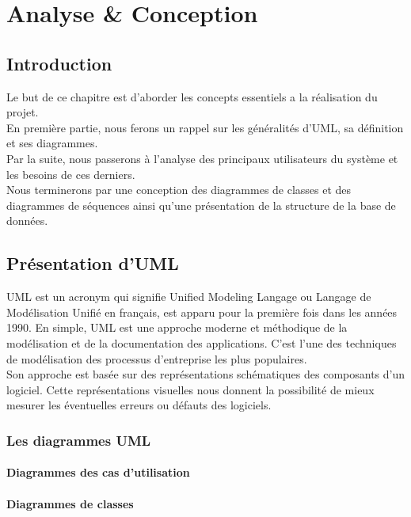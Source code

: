 \chapter{Analyse \& Conception}

\section{Introduction}
Le but de ce chapitre est d'aborder les concepts essentiels a la réalisation du projet.\\

En première partie, nous ferons un rappel sur les généralités d'UML, sa définition et ses diagrammes.\\

Par la suite, nous passerons à l'analyse des principaux utilisateurs du système et les besoins de ces derniers.\\

Nous terminerons par une conception des diagrammes de classes et des diagrammes de séquences ainsi qu'une présentation de la structure de la base de données.\\

\section{Présentation d'\acs{UML}}
\acs{UML} est un acronym qui signifie Unified Modeling Langage ou Langage de Modélisation Unifié en français, est apparu pour la première fois dans les années 1990. En simple, \acs{UML} est une approche moderne et méthodique de la modélisation et de la documentation des applications. C'est l'une des techniques de modélisation des processus d'entreprise les plus populaires.\\

Son approche est basée sur des représentations schématiques des composants d'un logiciel. Cette représentations visuelles nous donnent la possibilité de mieux mesurer les éventuelles erreurs ou défauts des logiciels.\\


\subsection{Les diagrammes \acs{UML}}
\subsubsection{Diagrammes des cas d'utilisation}
\subsubsection{Diagrammes de classes}
